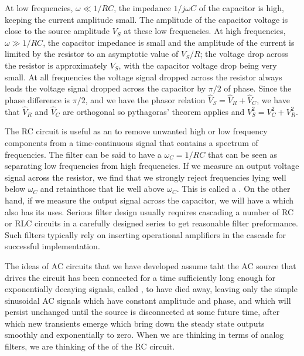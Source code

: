 At low frequencies, $\omega \ll 1/RC$, the impedance $1/j\omega C$ of the capacitor is high, keeping the current amplitude small. The amplitude of the capacitor voltage is close to the source amplitude $V_S$ at these low frequencies. At high frequencies, $\omega \gg 1/RC$, the capacitor impedance is small and the amplitude of the current is limited by the resistor to an asymptotic value of $V_S/R$; the voltage drop across the resistor is approximately $V_S$, with the capacitor voltage drop being very small. At all frequencies the voltage signal dropped across the resistor always leads the voltage signal dropped across the capacitor by $\pi/2$ of phase. Since the phase difference is $\pi/2$, and we have the phasor relation $\hat{V}_S = \hat{V}_R + \hat{V}_C$, we have that $\hat{V}_R$ and $\hat{V}_C$ are orthogonal so pythagoras' theorem applies and $V_S^2 = V_C^2+V_R^2$.

\begin{rmk}
    The RC circuit is useful as an  to remove unwanted high or low frequency components from a time-continuous signal that contains a spectrum of frequencies. The filter can be said to have a  $\omega_C = 1/RC$ that can be seen as separating low frequencies from high frequencies. If we measure an output voltage signal across the resistor, we find that we strongly reject frequencies lying well below $\omega_C$ and retainthose that lie well above $\omega_C$. This is called a . On the other hand, if we measure the output signal across the capacitor, we will have a  which also has its uses. Serious filter design usually requires cascading a number of RC or RLC circuits in a carefully designed series to get reasonable filter preformance. Such filters typically rely on inserting operational amplifiers in the cascade for successful implementation.
\end{rmk}

\begin{rmk}
    The ideas of AC circuits that we have developed assume taht the AC source that drives the circuit has been connected for a time sufficiently long enough for exponentially decaying signals, called , to have died away, leaving only the simple  sinusoidal AC signals which have constant amplitude and phase, and which will persist unchanged until the source is disconnected at some future time, after which new transients emerge which bring down the steady state outputs smoothly and exponentially to zero. When we are thinking in terms of analog filters, we are thinking of the  of the RC circuit.
\end{rmk}






